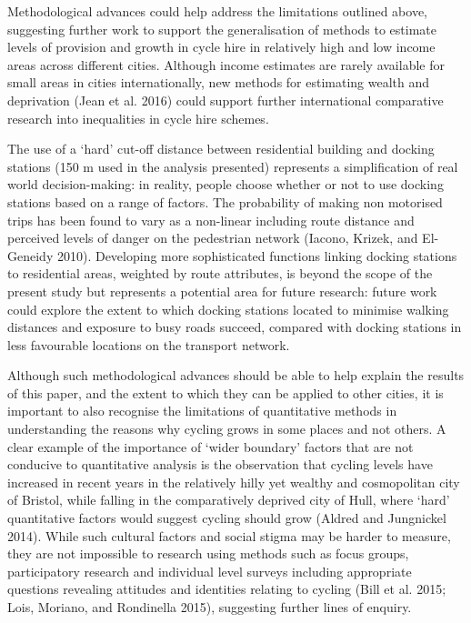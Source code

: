 \documentclass[
]{article}
\begin{document}
Methodological advances could help address the limitations outlined above, suggesting further work to support the generalisation of methods to estimate levels of provision and growth in cycle hire in relatively high and low income areas across different cities.
Although income estimates are rarely available for small areas in cities internationally, new methods for estimating wealth and deprivation (Jean et al. 2016) could support further international comparative research into inequalities in cycle hire schemes.

The use of a `hard' cut-off distance between residential building and docking stations (150 m used in the analysis presented) represents a simplification of real world decision-making: in reality, people choose whether or not to use docking stations based on a range of factors.
The probability of making non motorised trips has been found to vary as a non-linear including route distance and perceived levels of danger on the pedestrian network (Iacono, Krizek, and El-Geneidy 2010).
Developing more sophisticated functions linking docking stations to residential areas, weighted by route attributes, is beyond the scope of the present study but represents a potential area for future research: future work could explore the extent to which docking stations located to minimise walking distances and exposure to busy roads succeed, compared with docking stations in less favourable locations on the transport network.

Although such methodological advances should be able to help explain the results of this paper, and the extent to which they can be applied to other cities, it is important to also recognise the limitations of quantitative methods in understanding the reasons why cycling grows in some places and not others.
A clear example of the importance of `wider boundary' factors that are not conducive to quantitative analysis is the observation that cycling levels have increased in recent years in the relatively hilly yet wealthy and cosmopolitan city of Bristol, while falling in the comparatively deprived city of Hull, where `hard' quantitative factors would suggest cycling should grow (Aldred and Jungnickel 2014).
While such cultural factors and social stigma may be harder to measure, they are not impossible to research using methods such as focus groups, participatory research and individual level surveys including appropriate questions revealing attitudes and identities relating to cycling (Bill et al. 2015; Lois, Moriano, and Rondinella 2015), suggesting further lines of enquiry.
\end{document}
